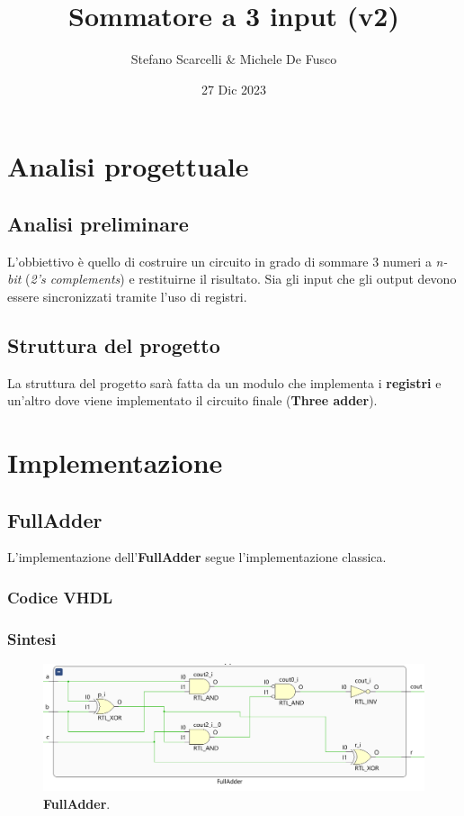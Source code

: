 \documentclass[12pt]{article}
\title{Sommatore a 3 input (v2)}
\author{Stefano Scarcelli \& Michele De Fusco}
\date{27 Dic 2023}
\begin{document}
\maketitle
\newpage

\tableofcontents
\newpage


\section{Analisi progettuale}
    \subsection{Analisi preliminare}
        L'obbiettivo è quello di costruire un circuito in grado di sommare 3 numeri a \textit{n-bit} (\textit{2's complements}) e restituirne il risultato. Sia gli input che gli output devono essere sincronizzati tramite l'uso di registri.
    
    \subsection{Struttura del progetto}
        La struttura del progetto sarà fatta da un modulo che implementa i \textbf{registri} e un'altro dove viene implementato il circuito finale (\textbf{Three adder}).

\section{Implementazione}
    \subsection{FullAdder}
        L'implementazione dell'\textbf{FullAdder} segue l'implementazione classica.

        \subsubsection{Codice VHDL}
           
            
        \subsubsection{Sintesi}
            \begin{figure}[ht]
                \centering
                \includegraphics[scale=0.45]{FullAdder.png}
                \caption{\textbf{FullAdder}.}
            \end{figure}
\end{document}
